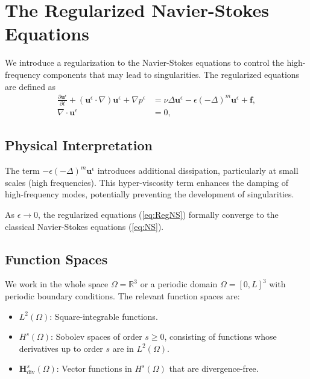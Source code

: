 \documentclass[11pt]{article}
\begin{document}
\section{The Regularized Navier-Stokes Equations}

We introduce a regularization to the Navier-Stokes equations to control the high-frequency components that may lead to singularities. The regularized equations are defined as
\begin{equation}
\begin{aligned}
\frac{\partial \mathbf{u}^\epsilon}{\partial t} + (\mathbf{u}^\epsilon \cdot \nabla)\mathbf{u}^\epsilon + \nabla p^\epsilon &= \nu \Delta \mathbf{u}^\epsilon - \epsilon (-\Delta)^m \mathbf{u}^\epsilon + \mathbf{f}, \\
\nabla \cdot \mathbf{u}^\epsilon &= 0,
\end{aligned}
\label{eq:RegNS}  %
\end{equation}

\subsection{Physical Interpretation}

The term $- \epsilon (-\Delta)^m \mathbf{u}^\epsilon$ introduces additional dissipation, particularly at small scales (high frequencies). This hyper-viscosity term enhances the damping of high-frequency modes, potentially preventing the development of singularities.

As $\epsilon \to 0$, the regularized equations (\ref{eq:RegNS}) formally converge to the classical Navier-Stokes equations (\ref{eq:NS}).

\subsection{Function Spaces}

We work in the whole space $\Omega = \mathbb{R}^3$ or a periodic domain $\Omega = [0, L]^3$ with periodic boundary conditions. The relevant function spaces are:

\begin{itemize}[itemsep=0pt]
    \item $L^2(\Omega)$: Square-integrable functions.
    \item $H^s(\Omega)$: Sobolev spaces of order $s \geq 0$, consisting of functions whose derivatives up to order $s$ are in $L^2(\Omega)$.
    \item $\mathbf{H}^s_{\text{div}}(\Omega)$: Vector functions in $H^s(\Omega)$ that are divergence-free.
\end{itemize}
\end{document}

